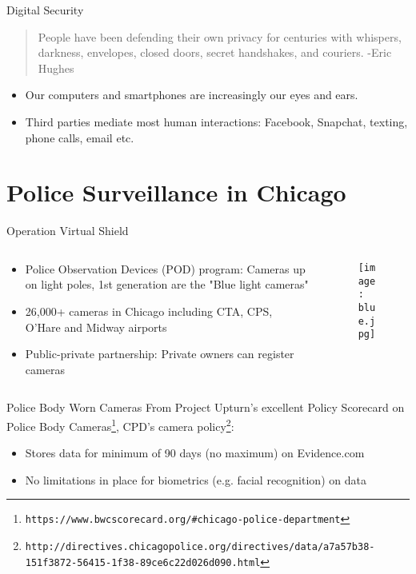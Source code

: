 \documentclass[newPxFont]{beamer}
\begin{document}
\begin{frame}{Digital Security}
\begin{quote}
People have been defending their
own privacy for centuries with
whispers, darkness, envelopes,
closed doors, secret handshakes,
and couriers. -Eric Hughes
\end{quote}
\begin{itemize}
\item<1-> Our computers and smartphones are increasingly our eyes and ears.
\item<2-> Third parties mediate most human interactions: Facebook, Snapchat, texting, phone calls, email etc.
\end{itemize}
\end{frame}

%
%

\section{Police Surveillance in Chicago}

\begin{frame}{Operation Virtual Shield}
\begin{columns}
\begin{column}{0.55\textwidth}
\begin{itemize}
\item<1-> Police Observation Devices (POD) program: Cameras up on light poles, 1st generation are the "Blue light cameras"
\item<2-> 26,000+ cameras in Chicago including CTA, CPS, O'Hare and Midway airports 
\item<3-> Public-private partnership: Private owners can register cameras
\end{itemize}
\end{column}
\begin{column}{0.45\textwidth}

\begin{figure}
\centering
\texttt{[image: blue.jpg]}
\end{figure}

\end{column}
\end{columns}
\end{frame}

\begin{frame}{Police Body Worn Cameras}
From Project Upturn's excellent Policy Scorecard on Police Body Cameras\footnote{\texttt{\tiny https://www.bwcscorecard.org/#chicago-police-department}}, CPD's camera policy\footnote{\texttt{\tiny http://directives.chicagopolice.org/directives/data/a7a57b38-151f3872-56415-1f38-89ce6c22d026d090.html}}:
\begin{itemize}
\item<1-> Stores data for minimum of 90 days (no maximum) on Evidence.com
\item<2-> No limitations in place for biometrics (e.g. facial recognition) on data
\end{itemize}
\end{frame}
\end{document}
